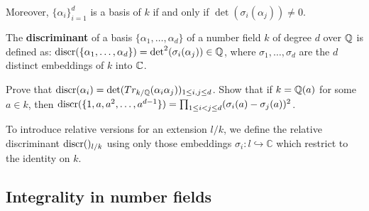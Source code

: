 \begin{outline}
        Moreover, $\{\alpha_i\}_{i=1}^d$ is a basis of $k$ if and only if $\det(\sigma_i(\alpha_j))\neq 0$.
    \0 \begin{definition}
        The \textbf{discriminant} of a basis $\{\alpha_1,\ldots,\alpha_d\}$ of a number field $k$ of degree $d$ over $\mathbb{Q}$ is defined as: $\operatorname{discr}({\{\alpha_1,\ldots,\alpha_d\}})=\det^2(\sigma_i(\alpha_j))\in\mathbb{Q}$, where $\sigma_1,\ldots,\sigma_d$ are the $d$ distinct embeddings of $k$ into $\mathbb{C}$.
    \end{definition}
    \begin{exercise}
        Prove that $\operatorname{discr}({\alpha_i}) = \det(Tr_{k/\mathbb{Q}}(\alpha_i\alpha_j))_{1 \leq i,j \leq d}$. Show that if $k = \mathbb{Q}(a)$ for some $a \in k$, then $\operatorname{discr}({\{1,a,a^2,\ldots,a^{d-1}\}}) = \prod_{1 \leq i < j \leq d}(\sigma_i(a)-\sigma_j(a))^2$.
    \end{exercise}
    \0 To introduce relative versions for an extension $l/k$, we define the relative discriminant $\operatorname{discr}({})_{l/k}$ using only those embeddings $\sigma_i : l \hookrightarrow \mathbb{C}$ which restrict to the identity on $k$.
\end{outline}

\subsection{Integrality in number fields}

